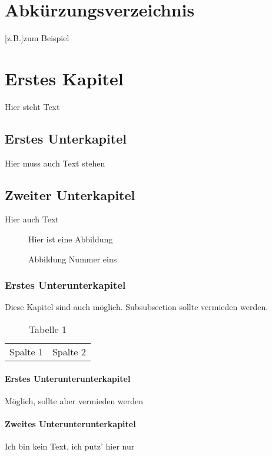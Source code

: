 \documentclass[11pt,a4paper]{scrreprt}
\begin{document}
\chapter*{Abkürzungsverzeichnis}
\thispagestyle{scrheadings}
\begin{acronym}
[z.B.]{zum Beispiel}
\end{acronym}

\listoffigures
\thispagestyle{scrheadings}

\listoftables
\thispagestyle{scrheadings}






\chapter{Erstes Kapitel}
\thispagestyle{scrheadings}
Hier steht Text

\section{Erstes Unterkapitel}
Hier muss auch Text stehen

\section{Zweiter Unterkapitel}
Hier auch Text
\begin{figure}[h]
Hier ist eine Abbildung
\caption{Abbildung Nummer eins}
\end{figure}

\subsection{Erstes Unterunterkapitel}
Diese Kapitel sind auch möglich. Subsubsection sollte vermieden werden.\\
\begin{table}[h]
\begin{tabular}{l l}
Spalte 1 & Spalte 2
\end{tabular}
\caption{Tabelle 1}
\end{table}

\subsubsection{Erstes Unterunterunterkapitel}
Möglich, sollte aber vermieden werden

\subsubsection{Zweites Unterunterunterkapitel}
Ich bin kein Text, ich putz' hier nur
\end{document}
